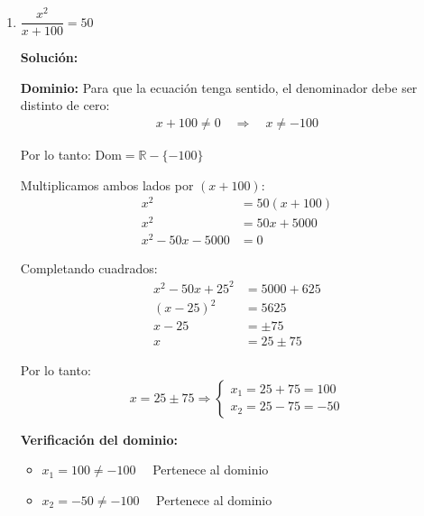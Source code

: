 \documentclass[12pt]{article}
\newcommand{\solucion}{%
    \vspace{0.8em}%
    \textbf{Solución:}%
}
\begin{document}
\begin{enumerate}[label=\alph*.-]
    Por lo tanto:
    \[
    \dfrac{3 \pm 17}{10} \Rightarrow \begin{cases} x_1 = \dfrac{3 + 17}{10} = 2 \\[0.5em] x_2 = \dfrac{3 - 17}{10} = -\dfrac{7}{5} \end{cases}
    \]

    \textbf{Verificación:} Ambos valores pertenecen al dominio ($x_1 \neq 1, -2$ y $x_2 \neq 1, -2$).

    \[
    \boxed{CS = \left\{-\dfrac{7}{5},\ 2\right\}}
    \]

    \item $\dfrac{x^2}{x+100} = 50$

    \solucion

    \textbf{Dominio:} Para que la ecuación tenga sentido, el denominador debe ser distinto de cero:
    \begin{align*}
    x + 100 \neq 0 \quad \Rightarrow \quad x \neq -100
    \end{align*}

    Por lo tanto: $\text{Dom} = \mathbb{R} - \{-100\}$

    Multiplicamos ambos lados por $(x + 100)$:
    \begin{align*}
    x^2 &= 50(x + 100) \\[0.3em]
    x^2 &= 50x + 5000 \\[0.3em]
    x^2 - 50x - 5000 &= 0
    \end{align*}

    Completando cuadrados:
    \begin{align*}
    x^2 - 50x + 25^2 &= 5000 + 625 \\[0.3em]
    (x - 25)^2 &= 5625 \\[0.3em]
    x - 25 &= \pm 75 \\[0.3em]
    x &= 25 \pm 75
    \end{align*}

    Por lo tanto:
    \[
    x = 25 \pm 75 \Rightarrow \begin{cases} x_1 = 25 + 75 = 100 \\ x_2 = 25 - 75 = -50 \end{cases}
    \]

    \textbf{Verificación del dominio:}
    \begin{itemize}
        \item $x_1 = 100 \neq -100$ \checkmark \ \ Pertenece al dominio
        \item $x_2 = -50 \neq -100$ \checkmark \ \ Pertenece al dominio
    \end{itemize}


\end{enumerate}
\end{document}
